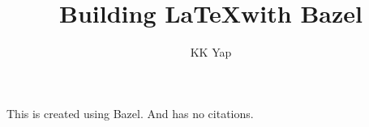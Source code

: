 \documentclass{article}
\begin{document}
\title{Building \LaTeX with Bazel}
\author{KK Yap}
\maketitle

This is created using Bazel.  And has no citations.
\end{document}
